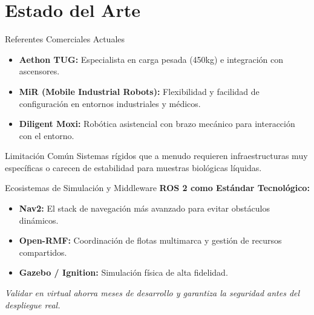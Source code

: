 \section{Estado del Arte}
\begin{frame}{Referentes Comerciales Actuales}
    \begin{itemize}
        \item \textbf{Aethon TUG:} Especialista en carga pesada (450kg) e integración con ascensores.
        \item \textbf{MiR (Mobile Industrial Robots):} Flexibilidad y facilidad de configuración en entornos industriales y médicos.
        \item \textbf{Diligent Moxi:} Robótica asistencial con brazo mecánico para interacción con el entorno.
    \end{itemize}
    \vspace{0.3cm}
    \begin{block}{Limitación Común}
        Sistemas rígidos que a menudo requieren infraestructuras muy específicas o carecen de estabilidad para muestras biológicas líquidas.
    \end{block}
\end{frame}

\begin{frame}{Ecosistemas de Simulación y Middleware}
    \textbf{ROS 2 como Estándar Tecnológico:}
    \begin{itemize}
        \item[$\bullet$] \textbf{Nav2:} El stack de navegación más avanzado para evitar obstáculos dinámicos.
        \item[$\bullet$] \textbf{Open-RMF:} Coordinación de flotas multimarca y gestión de recursos compartidos.
        \item[$\bullet$] \textbf{Gazebo / Ignition:} Simulación física de alta fidelidad.
    \end{itemize}
    \vspace{0.3cm}
    \textit{Validar en virtual ahorra meses de desarrollo y garantiza la seguridad antes del despliegue real.}
\end{frame}

